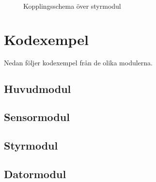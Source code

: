 \documentclass[11pt]{article}
\begin{document}
\begin{flushleft}
\begin{figure}[htbp]
\centering
\noindent{}
	\caption{Kopplingsschema över styrmodul \label{kopplingsschema:sensormodul}}	
\end{figure}

\pagebreak
\setcounter{section}{15}
\section{Kodexempel}
Nedan följer kodexempel från de olika modulerna.

\subsection{Huvudmodul}


\subsection{Sensormodul}


\subsection{Styrmodul}


\subsection{Datormodul}






\pagebreak

\end{flushleft}
\end{document}
